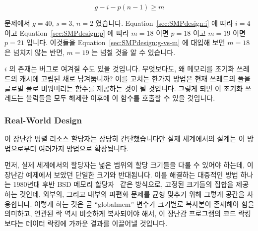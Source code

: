{	\begin{equation}
		g - i - p(n - 1) \ge m
	\label{sec:SMPdesign:g-vs-m}
	\end{equation}

	문제에서 $g=40$, $s=3$, $n=2$ 였습니다.
	Equation~\ref{sec:SMPdesign:i} 에 따라 $i=4$ 이고
	Equation~\ref{sec:SMPdesign:p} 에 따라 $m=18$ 이면 $p=18$ 이고 $m=19$
	이면 $p=21$ 입니다.
	이것들을 Equation~\ref{sec:SMPdesign:g-vs-m} 에 대입해 보면 $m=18$ 은
	넘치지 않는 반면, $m=19$ 는 넘칠 것을 알 수 있습니다.

	$i$ 의 존재는 버그로 여겨질 수도 있을 것입니다.
	무엇보다도, 왜 메모리를 초기화 쓰레드의 캐시에 고립된 채로 남겨둡니까?
	이를 고치는 한가지 방법은 현재 쓰레드의 풀을 글로벌 풀로 비워버리는
	 함수를 제공하는 것이 될 것입니다.
	그렇게 되면 이 초기화 쓰레드는 블럭들을 모두 해제한 이후에 이 함수를
	호출할 수 있을 것입니다.

} \QuickQuizEnd

\subsubsection{Real-World Design}

이 장난감 병렬 리소스 할당자는 상당히 간단했습니다만 실제 세계에서의 설계는 이
방법으로부터 여러가지 방법으로 확장됩니다.

먼저, 실제 세계에서의 할당자는 넓은 범위의 할당 크기들을 다룰 수 있어야 하는데,
이 장난감 예제에서 보았던 단일한 크기와 반대됩니다.
이를 해결하는 대중적인 방법 하나는 1980년대 후반 BSD 메모리
할당자~\cite{McKusick88} 같은 방식으로, 고정된 크기들의 집합을 제공하는 것인데,
외부의, 그리고 내부의 파편화 문제를 균형 맞추기 위해 그렇게 공간을 사용합니다.
이렇게 하는 것은 곧 ``globalmem'' 변수가 크기별로 복사본이 존재해야 함을
의미하고, 연관된 락 역시 비슷하게 복사되어야 해서, 이 장난감 프로그램의 코드
락킹보다는 데이터 락킹에 가까운 결과를 이끌어낼 것입니다.
\iffalse

